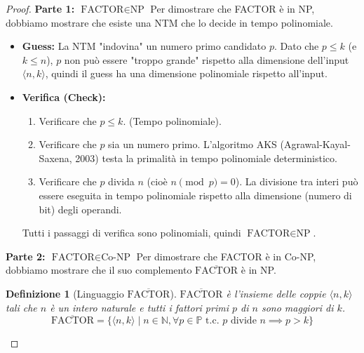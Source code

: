 \documentclass[a4paper, 11pt]{book} %
\newtheorem{definition}[theorem]{Definizione}
\theoremstyle{definition}
\begin{document}
\begin{proof}
\textbf{Parte 1: $\text{FACTOR} \in \text{NP}$}
Per dimostrare che FACTOR è in NP, dobbiamo mostrare che esiste una NTM che lo decide in tempo polinomiale.
\begin{itemize}
    \item \textbf{Guess:} La NTM "indovina" un numero primo candidato $p$. Dato che $p \le k$ (e $k \le n$), $p$ non può essere "troppo grande" rispetto alla dimensione dell'input $\langle n, k \rangle$, quindi il guess ha una dimensione polinomiale rispetto all'input.
    \item \textbf{Verifica (Check):}
    \begin{enumerate}
        \item Verificare che $p \le k$. (Tempo polinomiale).
        \item Verificare che $p$ sia un numero primo. L'algoritmo AKS (Agrawal-Kayal-Saxena, 2003) testa la primalità in tempo polinomiale deterministico.
        \item Verificare che $p$ divida $n$ (cioè $n \pmod p = 0$). La divisione tra interi può essere eseguita in tempo polinomiale rispetto alla dimensione (numero di bit) degli operandi.
    \end{enumerate}
    Tutti i passaggi di verifica sono polinomiali, quindi $\text{FACTOR} \in \text{NP}$.
\end{itemize}

\textbf{Parte 2: $\text{FACTOR} \in \text{Co-NP}$}
Per dimostrare che FACTOR è in Co-NP, dobbiamo mostrare che il suo complemento $\overline{\text{FACTOR}}$ è in NP.

\begin{definition}[Linguaggio $\overline{\text{FACTOR}}$]
$\overline{\text{FACTOR}}$ è l'insieme delle coppie $\langle n, k \rangle$ tali che $n$ è un intero naturale e \textit{tutti} i fattori primi $p$ di $n$ sono maggiori di $k$.
\[
\overline{\text{FACTOR}} = \{ \langle n, k \rangle \mid n \in \mathbb{N}, \forall p \in \mathbb{P} \text{ t.c. } p \text{ divide } n \implies p > k \}
\]
\end{definition}


\end{proof}
\end{document}
